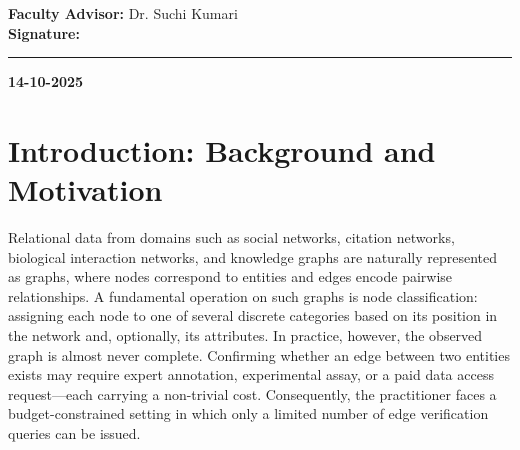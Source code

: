 \documentclass[11pt,a4paper]{article}
\newcommand{\supervisor}{Dr. Suchi Kumari}
\begin{document}
\vspace{1.5cm}
\noindent\textbf{Faculty Advisor:} \supervisor\\[1.5cm]
\noindent\textbf{Signature:} \rule{5cm}{0.4pt} \hfill \textbf{14-10-2025}
\newpage

\begin{abstract}
Graph-structured data arising from social, biological, and information networks is frequently
only partially observed, as verifying the existence of a link between two entities may require
expert knowledge, experimental effort, or restricted data access. Given a fixed budget of such
verification queries, this project investigates which candidate links should be prioritised so
that a designated set of target nodes can be classified as accurately as possible. We introduce
a task-aware query scoring framework in which each candidate link is evaluated by its expected
contribution to the classifier's confidence on the target nodes, weighted by the estimated
probability that the link exists. The classifier employed is label propagation, whose closed-form
solution permits exact evaluation of every candidate without model retraining. On synthetic
community-structured graphs generated under the Contextual Stochastic Block Model, we find that
strategies that maximise the number of true links discovered do not maximise classification
accuracy on the targets. In contrast, the proposed task-aware strategy closes 45--53\,\% of the
accuracy gap between a partially observed and a fully observed network within 200 queries,
compared with at most 13\,\% for standard link-prediction and uncertainty-based heuristics.
These findings replicate on held-out random seeds and remain stable under three distinct
link-hiding schemes. The project further examines the incremental benefit of adaptive
(sequential) query selection and characterises the role of target reachability as the primary
mechanism underlying accuracy improvement. Limitations of the current study and directions for
future work are discussed.
\end{abstract}

\section{Introduction: Background and Motivation}

Relational data from domains such as social networks, citation networks, biological interaction
networks, and knowledge graphs are naturally represented as graphs, where nodes correspond to
entities and edges encode pairwise relationships. A fundamental operation on such graphs is
node classification: assigning each node to one of several discrete categories based on its
position in the network and, optionally, its attributes. In practice, however, the observed
graph is almost never complete. Confirming whether an edge between two entities exists may
require expert annotation, experimental assay, or a paid data access request---each carrying
a non-trivial cost. Consequently, the practitioner faces a budget-constrained setting in which
only a limited number of edge verification queries can be issued.
\end{document}
